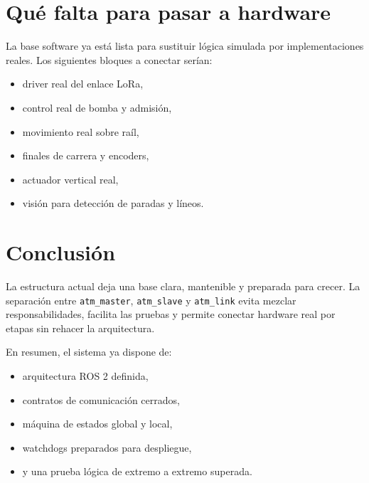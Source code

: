 \documentclass[11pt,a4paper]{article}
\begin{document}
\section{Qu\'e falta para pasar a hardware}
La base software ya est\'a lista para sustituir l\'ogica simulada por implementaciones reales. Los siguientes bloques a conectar ser\'ian:

\begin{itemize}
    \item driver real del enlace LoRa,
    \item control real de bomba y admisi\'on,
    \item movimiento real sobre ra\'il,
    \item finales de carrera y encoders,
    \item actuador vertical real,
    \item visi\'on para detecci\'on de paradas y l\'ineos.
\end{itemize}

\section{Conclusi\'on}
La estructura actual deja una base clara, mantenible y preparada para crecer. La separaci\'on entre \texttt{atm\_master}, \texttt{atm\_slave} y \texttt{atm\_link} evita mezclar responsabilidades, facilita las pruebas y permite conectar hardware real por etapas sin rehacer la arquitectura.

En resumen, el sistema ya dispone de:

\begin{itemize}
    \item arquitectura ROS 2 definida,
    \item contratos de comunicaci\'on cerrados,
    \item m\'aquina de estados global y local,
    \item watchdogs preparados para despliegue,
    \item y una prueba l\'ogica de extremo a extremo superada.
\end{itemize}
\end{document}
